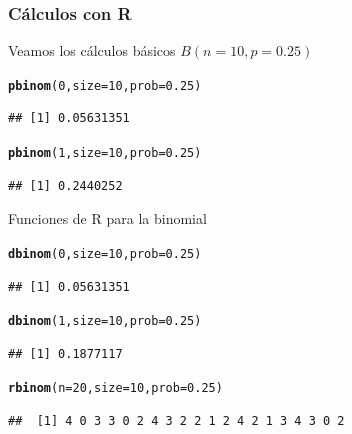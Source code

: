\documentclass[handout]{beamer}\usepackage[]{graphicx}\usepackage[]{color}
\makeatletter
\newcommand{\hlnum}[1]{\textcolor[rgb]{0.686,0.059,0.569}{#1}}%
\newcommand{\hlstd}[1]{\textcolor[rgb]{0.345,0.345,0.345}{#1}}%
\newcommand{\hlkwc}[1]{\textcolor[rgb]{0.333,0.667,0.333}{#1}}%
\newcommand{\hlkwd}[1]{\textcolor[rgb]{0.737,0.353,0.396}{\textbf{#1}}}%
\newenvironment{kframe}{%
 \def\at@end@of@kframe{}%
 \ifinner\ifhmode%
  \def\at@end@of@kframe{\end{minipage}}%
  \begin{minipage}{\columnwidth}%
 \fi\fi%
 \def\FrameCommand##1{\hskip\@totalleftmargin \hskip-\fboxsep
 \colorbox{shadecolor}{##1}\hskip-\fboxsep
     \hskip-\linewidth \hskip-\@totalleftmargin \hskip\columnwidth}%
 \MakeFramed {\advance\hsize-\width
   \@totalleftmargin\z@ \linewidth\hsize
   \@setminipage}}%
 {\par\unskip\endMakeFramed%
 \at@end@of@kframe}
\newenvironment{knitrout}{}{} %
\theoremstyle{plain}
\theoremstyle{definition}
\makeatother
\begin{document}
\begin{frame}[fragile]
\frametitle{Cálculos con R}
Veamos los cálculos básicos $B(n=10,p=0.25)$

\begin{knitrout}
\color{fgcolor}\begin{kframe}
\begin{alltt}
\hlkwd{pbinom}\hlstd{(}\hlnum{0}\hlstd{,}\hlkwc{size}\hlstd{=}\hlnum{10}\hlstd{,}\hlkwc{prob}\hlstd{=}\hlnum{0.25}\hlstd{)}
\end{alltt}
\begin{verbatim}
## [1] 0.05631351
\end{verbatim}
\begin{alltt}
\hlkwd{pbinom}\hlstd{(}\hlnum{1}\hlstd{,}\hlkwc{size}\hlstd{=}\hlnum{10}\hlstd{,}\hlkwc{prob}\hlstd{=}\hlnum{0.25}\hlstd{)}
\end{alltt}
\begin{verbatim}
## [1] 0.2440252
\end{verbatim}
\end{kframe}
\end{knitrout}

\end{frame}

\begin{frame}[fragile]
Funciones de R para la binomial 

\begin{knitrout}
\color{fgcolor}\begin{kframe}
\begin{alltt}
\hlkwd{dbinom}\hlstd{(}\hlnum{0}\hlstd{,}\hlkwc{size}\hlstd{=}\hlnum{10}\hlstd{,}\hlkwc{prob}\hlstd{=}\hlnum{0.25}\hlstd{)}
\end{alltt}
\begin{verbatim}
## [1] 0.05631351
\end{verbatim}
\begin{alltt}
\hlkwd{dbinom}\hlstd{(}\hlnum{1}\hlstd{,}\hlkwc{size}\hlstd{=}\hlnum{10}\hlstd{,}\hlkwc{prob}\hlstd{=}\hlnum{0.25}\hlstd{)}
\end{alltt}
\begin{verbatim}
## [1] 0.1877117
\end{verbatim}
\begin{alltt}
\hlkwd{rbinom}\hlstd{(}\hlkwc{n}\hlstd{=}\hlnum{20}\hlstd{,}\hlkwc{size} \hlstd{=} \hlnum{10}\hlstd{,}\hlkwc{prob}\hlstd{=}\hlnum{0.25}\hlstd{)}
\end{alltt}
\begin{verbatim}
##  [1] 4 0 3 3 0 2 4 3 2 2 1 2 4 2 1 3 4 3 0 2
\end{verbatim}
\end{kframe}
\end{knitrout}

\end{frame}
\end{document}
